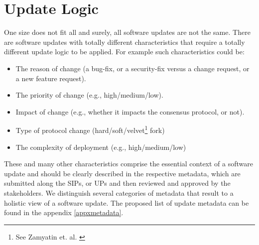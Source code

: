\section{Update Logic} \label{updlogic}
One size does not fit all and surely, all software updates are not the same. There are software updates with totally different characteristics that require a totally different update logic to be applied. For example such characteristics could be:
\begin{itemize}
\item The reason of change (a bug-fix, or a security-fix versus a change request, or a new feature request).
\item The priority of change (e.g., high/medium/low).
\item Impact of change (e.g., whether it impacts the consensus protocol, or not).
\item Type of protocol change (hard/soft/velvet\footnote{See Zamyatin et. al. \cite{velvet}} fork)
\item The complexity of deployment (e.g., high/medium/low)
\end{itemize}
These and many other characteristics comprise the essential context of a software update and should be clearly described in the respective metadata, which are submitted along the SIPs, or UPs and then reviewed and approved by the stakeholders. We distinguish several categories of metadata that result to a holistic view of a software update. The proposed list of update metadata can be found in the appendix \ref{appxmetadata}. 

